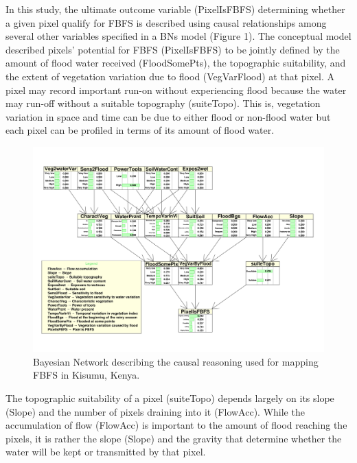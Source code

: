 \documentclass[12pt,oneside]{article}
\begin{document}
In this study, the ultimate outcome variable (PixelIsFBFS) determining whether a given pixel qualify for FBFS is described using causal relationships among several other variables specified in a BNs model (Figure 1). The conceptual model described pixels' potential for FBFS (PixelIsFBFS) to be jointly defined by the amount of flood water received (FloodSomePts), the topographic suitability, and the extent of vegetation variation due to flood (VegVarFlood) at that pixel. A pixel may record important run-on without experiencing flood because the water may run-off without a suitable topography (suiteTopo). This is, vegetation variation in space and time can be due to either flood or non-flood water but each pixel can be profiled in terms of its amount of flood water.

\begin{figure}
\includegraphics[width=1\linewidth]{figures/Mapping_FBFS_bayesian_network} \caption{Bayesian Network describing the causal reasoning used for mapping FBFS in Kisumu, Kenya.}\label{fig:fig1}
\end{figure}

The topographic suitability of a pixel (suiteTopo) depends largely on its slope (Slope) and the number of pixels draining into it (FlowAcc). While the accumulation of flow (FlowAcc) is important to the amount of flood reaching the pixels, it is rather the slope (Slope) and the gravity that determine whether the water will be kept or transmitted by that pixel.
\end{document}

